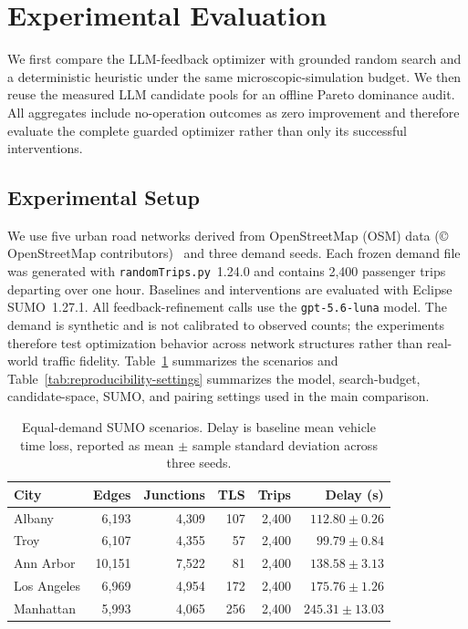 \documentclass{trbunofficial}
\begin{document}
\section{Experimental Evaluation}
\label{sec:experiments}

We first compare the LLM-feedback optimizer with grounded random search and a
deterministic heuristic under the same microscopic-simulation budget.  We then
reuse the measured LLM candidate pools for an offline Pareto dominance audit.
All aggregates include no-operation outcomes as zero improvement and therefore
evaluate the complete guarded optimizer rather than only its successful
interventions.

\subsection{Experimental Setup}
\label{sec:experimental-setup}

We use five urban road networks derived from OpenStreetMap (OSM) data
(\copyright{} OpenStreetMap contributors)~\cite{openstreetmap} and three demand
seeds.  Each frozen demand file was generated with
\texttt{randomTrips.py}~1.24.0 and contains 2,400 passenger trips departing over
one hour.  Baselines and interventions are evaluated with Eclipse SUMO~1.27.1.
All feedback-refinement calls use the \texttt{gpt-5.6-luna} model.  The demand
is synthetic and is not calibrated to observed counts; the experiments
therefore test optimization behavior across network structures rather than
real-world traffic fidelity.  Table~\ref{tab:scenario-summary}
summarizes the scenarios and Table~\ref{tab:reproducibility-settings} summarizes the model, search-budget,
candidate-space, SUMO, and pairing settings used in the main comparison.

\begin{table}[!ht]
  \caption{Equal-demand SUMO scenarios. Delay is baseline mean vehicle time
  loss, reported as mean $\pm$ sample standard deviation across three seeds.}
  \label{tab:scenario-summary}
  \begin{center}
    \begin{tabular}{lrrrrr}
      \hline
      City & Edges & Junctions & TLS & Trips & Delay (s) \\
      \hline
      Albany      &  6,193 & 4,309 & 107 & 2,400 & $112.80 \pm 0.26$ \\
      Troy        &  6,107 & 4,355 &  57 & 2,400 & $ 99.79 \pm 0.84$ \\
      Ann Arbor   & 10,151 & 7,522 &  81 & 2,400 & $138.58 \pm 3.13$ \\
      Los Angeles &  6,969 & 4,954 & 172 & 2,400 & $175.76 \pm 1.26$ \\
      Manhattan   &  5,993 & 4,065 & 256 & 2,400 & $245.31 \pm 13.03$ \\
      \hline
    \end{tabular}
  \end{center}
\end{table}
\end{document}
